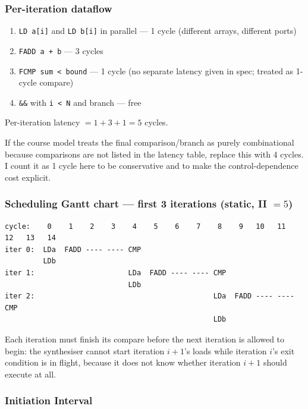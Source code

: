 \documentclass[11pt,a4paper]{article}
\begin{document}
\subsubsection*{Per-iteration dataflow}

\begin{enumerate}[noitemsep]
  \item \texttt{LD a[i]} and \texttt{LD b[i]} in parallel --- 1 cycle (different arrays, different ports)
  \item \texttt{FADD a + b} --- 3 cycles
  \item \texttt{FCMP sum \textless\ bound} --- 1 cycle (no separate latency given in spec; treated as 1-cycle compare)
  \item \texttt{\&\&} with \texttt{i < N} and branch --- free
\end{enumerate}

Per-iteration latency $= 1 + 3 + 1 = 5$ cycles.

If the course model treats the final comparison/branch as purely combinational because comparisons are not listed in the latency table, replace this with 4 cycles. I count it as 1 cycle here to be conservative and to make the control-dependence cost explicit.

\subsubsection*{Scheduling Gantt chart --- first 3 iterations (static, II $=5$)}

\begin{lstlisting}[style=schedule]
cycle:    0    1    2    3    4    5    6    7    8    9   10   11   12   13   14
iter 0:  LDa  FADD ---- ---- CMP
         LDb
iter 1:                      LDa  FADD ---- ---- CMP
                             LDb
iter 2:                                          LDa  FADD ---- ---- CMP
                                                 LDb
\end{lstlisting}

Each iteration must finish its compare before the next iteration is allowed to begin: the synthesiser cannot start iteration $i+1$'s loads while iteration $i$'s exit condition is in flight, because it does not know whether iteration $i+1$ should execute at all.

\subsubsection*{Initiation Interval}
\end{document}

